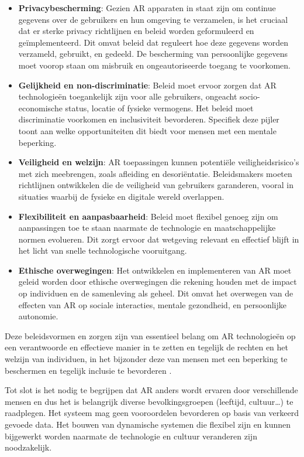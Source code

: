 \begin{itemize}
    \item \textbf{Privacybescherming}: Gezien AR apparaten in staat zijn om continue gegevens over de gebruikers en hun omgeving te verzamelen, is het cruciaal dat er sterke privacy richtlijnen en beleid worden geformuleerd en geïmplementeerd. Dit omvat beleid dat reguleert hoe deze gegevens worden verzameld, gebruikt, en gedeeld. De bescherming van persoonlijke gegevens moet voorop staan om misbruik en ongeautoriseerde toegang te voorkomen.
    \item \textbf{Gelijkheid en non-discriminatie}: Beleid moet ervoor zorgen dat AR technologieën toegankelijk zijn voor alle gebruikers, ongeacht socio-economische status, locatie of fysieke vermogens. Het beleid moet discriminatie voorkomen en inclusiviteit bevorderen. Specifiek deze pijler toont aan welke opportuniteiten dit biedt voor mensen met een mentale beperking.
    \item \textbf{Veiligheid en welzijn}: AR toepassingen kunnen potentiële veiligheidsrisico's met zich meebrengen, zoals afleiding en desoriëntatie. Beleidsmakers moeten richtlijnen ontwikkelen die de veiligheid van gebruikers garanderen, vooral in situaties waarbij de fysieke en digitale wereld overlappen.
    \item \textbf{Flexibiliteit en aanpasbaarheid}: Beleid moet flexibel genoeg zijn om aanpassingen toe te staan naarmate de technologie en maatschappelijke normen evolueren. Dit zorgt ervoor dat wetgeving relevant en effectief blijft in het licht van snelle technologische vooruitgang.
    \item \textbf{Ethische overwegingen}: Het ontwikkelen en implementeren van AR moet geleid worden door ethische overwegingen die rekening houden met de impact op individuen en de samenleving als geheel. Dit omvat het overwegen van de effecten van AR op sociale interacties, mentale gezondheid, en persoonlijke autonomie.
\end{itemize}

Deze beleidsvormen en zorgen zijn van essentieel belang om AR technologieën op een verantwoorde en effectieve manier in te zetten en tegelijk de rechten en het welzijn van individuen, in het bijzonder deze van mensen met een beperking te beschermen en tegelijk inclusie te bevorderen \autocite{Roesner2014}.

Tot slot is het nodig te begrijpen dat AR anders wordt ervaren door verschillende mensen en dus het is belangrijk diverse bevolkingsgroepen (leeftijd, cultuur\ldots) te raadplegen. Het systeem mag geen vooroordelen bevorderen op basis van verkeerd gevoede data. Het bouwen van dynamische systemen die flexibel zijn en kunnen bijgewerkt worden naarmate de technologie en cultuur veranderen zijn noodzakelijk. 

